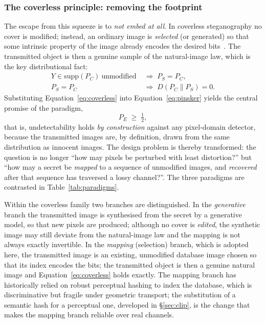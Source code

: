 \documentclass[10pt,a4paper]{article}
\theoremstyle{definition}
\begin{document}
\subsubsection{The coverless principle: removing the footprint}\label{sec:coverless}
The escape from this squeeze is to \emph{not embed at all}. In coverless
steganography no cover is modified; instead, an ordinary image is
\emph{selected} (or generated) so that some intrinsic property of the image already
encodes the desired bits~\cite{zhou2015,coverlessSurvey2024}. The transmitted
object is then a genuine sample of the natural-image law, which is the key
distributional fact:
\begin{equation}
  \begin{aligned}
  Y\in\mathrm{supp}(P_C)\ \text{unmodified}
  &\;\Longrightarrow\; P_S=P_C,\\
  P_S=P_C &\;\Longrightarrow\; D\!\left(P_C\|P_S\right)=0 .
  \end{aligned}
  \label{eq:coverless}
\end{equation}
Substituting Equation~\eqref{eq:coverless} into Equation~\eqref{eq:pinsker} yields the central promise of
the paradigm,
\begin{equation}
  P_E \;\ge\; \tfrac{1}{2},
  \label{eq:chance}
\end{equation}
that is, undetectability holds \emph{by construction} against any pixel-domain
detector, because the transmitted images are, by definition, drawn from the same
distribution as innocent images. The design problem is thereby transformed: the
question is no longer ``how may pixels be perturbed with least distortion?'' but
``how may a secret be \emph{mapped} to a sequence of unmodified images, and
\emph{recovered} after that sequence has traversed a lossy channel?''. The
three paradigms are contrasted in Table~\ref{tab:paradigms}.

Within the coverless family two branches are distinguished. In the
\emph{generative} branch the transmitted image is synthesised from the secret by a
generative model, so that new pixels are produced; although no cover is
\emph{edited}, the synthetic image may still deviate from the natural-image law and
the mapping is not always exactly invertible. In the \emph{mapping} (selection)
branch, which is adopted here, the transmitted image is an existing, unmodified
database image chosen so that its index encodes the bits; the transmitted object is
then a genuine natural image and Equation~\eqref{eq:coverless} holds exactly. The mapping
branch has historically relied on robust perceptual hashing to index the database,
which is discriminative but fragile under geometric transport; the substitution of
a semantic hash for a perceptual one, developed in \S\ref{sec:clip}, is the change
that makes the mapping branch reliable over real channels.
\end{document}
